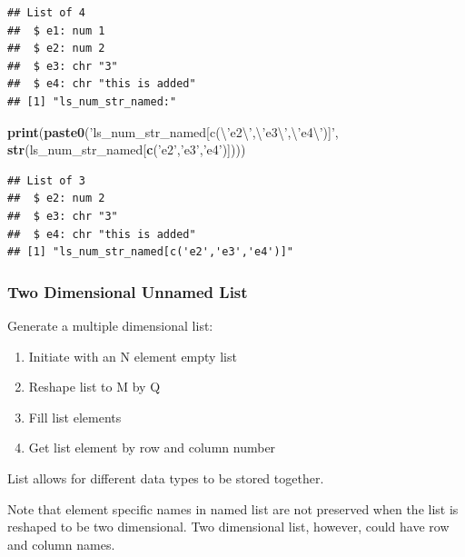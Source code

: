 \documentclass[
]{book}
\newenvironment{Shaded}{\begin{snugshade}}{\end{snugshade}}
\newcommand{\CharTok}[1]{\textcolor[rgb]{0.31,0.60,0.02}{#1}}
\newcommand{\KeywordTok}[1]{\textcolor[rgb]{0.13,0.29,0.53}{\textbf{#1}}}
\newcommand{\NormalTok}[1]{#1}
\newcommand{\StringTok}[1]{\textcolor[rgb]{0.31,0.60,0.02}{#1}}
\providecommand{\tightlist}{%
  \setlength{\itemsep}{0pt}\setlength{\parskip}{0pt}}
\begin{document}
\begin{verbatim}
## List of 4
##  $ e1: num 1
##  $ e2: num 2
##  $ e3: chr "3"
##  $ e4: chr "this is added"
## [1] "ls_num_str_named:"
\end{verbatim}

\begin{Shaded}
\begin{Highlighting}[]
\KeywordTok{print}\NormalTok{(}\KeywordTok{paste0}\NormalTok{(}\StringTok{'ls_num_str_named[c(}\CharTok{\textbackslash{}'}\StringTok{e2}\CharTok{\textbackslash{}'}\StringTok{,}\CharTok{\textbackslash{}'}\StringTok{e3}\CharTok{\textbackslash{}'}\StringTok{,}\CharTok{\textbackslash{}'}\StringTok{e4}\CharTok{\textbackslash{}'}\StringTok{)]'}\NormalTok{, }\KeywordTok{str}\NormalTok{(ls_num_str_named[}\KeywordTok{c}\NormalTok{(}\StringTok{'e2'}\NormalTok{,}\StringTok{'e3'}\NormalTok{,}\StringTok{'e4'}\NormalTok{)])))}
\end{Highlighting}
\end{Shaded}

\begin{verbatim}
## List of 3
##  $ e2: num 2
##  $ e3: chr "3"
##  $ e4: chr "this is added"
## [1] "ls_num_str_named[c('e2','e3','e4')]"
\end{verbatim}

\hypertarget{two-dimensional-unnamed-list}{%
\subsubsection{Two Dimensional Unnamed List}\label{two-dimensional-unnamed-list}}

Generate a multiple dimensional list:

\begin{enumerate}
\def\labelenumi{\arabic{enumi}.}
\tightlist
\item
  Initiate with an N element empty list
\item
  Reshape list to M by Q
\item
  Fill list elements
\item
  Get list element by row and column number
\end{enumerate}

List allows for different data types to be stored together.

Note that element specific names in named list are not preserved when the list is reshaped to be two dimensional. Two dimensional list, however, could have row and column names.
\end{document}
